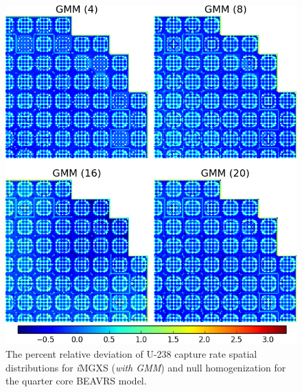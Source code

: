 \begin{figure}[h!]
\centering
\includegraphics[width=0.9\linewidth]{figures/results/compare/full-core/compare-capt-gmm}
\vspace{2mm}
\caption[U-238 capture rate \textit{i}MGXS-to-null relative deviations]{The percent relative deviation of U-238 capture rate spatial distributions for \textit{i}\ac{MGXS} (\textit{with \ac{GMM}}) and null homogenization for the quarter core BEAVRS model.}
\label{fig:chap11-full-core-capt-rates-gmm-comp}
\end{figure}

\clearpage

